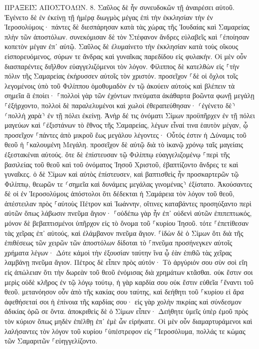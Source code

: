 \documentclass[twoside, 9pt]{extreport}
\begin{document}
ΠΡΑΞΕΙΣ ΑΠΟΣΤΟΛΩΝ.
8.
Σαῦλος δὲ ἦν συνευδοκῶν τῇ ἀναιρέσει αὐτοῦ. Ἐγένετο δὲ ἐν ἐκείνῃ τῇ ἡμέρᾳ διωγμὸς μέγας ἐπὶ τὴν ἐκκλησίαν τὴν ἐν Ἱεροσολύμοις· πάντες δὲ διεσπάρησαν κατὰ τὰς χώρας τῆς Ἰουδαίας καὶ Σαμαρείας πλὴν τῶν ἀποστόλων. 
συνεκόμισαν δὲ τὸν Στέφανον ἄνδρες εὐλαβεῖς καὶ ⸀ἐποίησαν κοπετὸν μέγαν ἐπ᾽ αὐτῷ. 
Σαῦλος δὲ ἐλυμαίνετο τὴν ἐκκλησίαν κατὰ τοὺς οἴκους εἰσπορευόμενος, σύρων τε ἄνδρας καὶ γυναῖκας παρεδίδου εἰς φυλακήν. 
Οἱ μὲν οὖν διασπαρέντες διῆλθον εὐαγγελιζόμενοι τὸν λόγον. 
Φίλιππος δὲ κατελθὼν εἰς ⸀τὴν πόλιν τῆς Σαμαρείας ἐκήρυσσεν αὐτοῖς τὸν χριστόν. 
προσεῖχον ⸀δὲ οἱ ὄχλοι τοῖς λεγομένοις ὑπὸ τοῦ Φιλίππου ὁμοθυμαδὸν ἐν τῷ ἀκούειν αὐτοὺς καὶ βλέπειν τὰ σημεῖα ἃ ἐποίει· 
⸀πολλοὶ γὰρ τῶν ἐχόντων πνεύματα ἀκάθαρτα βοῶντα φωνῇ μεγάλῃ ⸀ἐξήρχοντο, πολλοὶ δὲ παραλελυμένοι καὶ χωλοὶ ἐθεραπεύθησαν· 
⸂ἐγένετο δὲ⸃ ⸂πολλὴ χαρὰ⸃ ἐν τῇ πόλει ἐκείνῃ. 
Ἀνὴρ δέ τις ὀνόματι Σίμων προϋπῆρχεν ἐν τῇ πόλει μαγεύων καὶ ⸀ἐξιστάνων τὸ ἔθνος τῆς Σαμαρείας, λέγων εἶναί τινα ἑαυτὸν μέγαν, 
ᾧ προσεῖχον ⸀πάντες ἀπὸ μικροῦ ἕως μεγάλου λέγοντες· Οὗτός ἐστιν ἡ Δύναμις τοῦ θεοῦ ἡ ⸀καλουμένη Μεγάλη. 
προσεῖχον δὲ αὐτῷ διὰ τὸ ἱκανῷ χρόνῳ ταῖς μαγείαις ἐξεστακέναι αὐτούς. 
ὅτε δὲ ἐπίστευσαν τῷ Φιλίππῳ εὐαγγελιζομένῳ ⸀περὶ τῆς βασιλείας τοῦ θεοῦ καὶ τοῦ ὀνόματος Ἰησοῦ Χριστοῦ, ἐβαπτίζοντο ἄνδρες τε καὶ γυναῖκες. 
ὁ δὲ Σίμων καὶ αὐτὸς ἐπίστευσεν, καὶ βαπτισθεὶς ἦν προσκαρτερῶν τῷ Φιλίππῳ, θεωρῶν τε ⸂σημεῖα καὶ δυνάμεις μεγάλας γινομένας⸃ ἐξίστατο. 
Ἀκούσαντες δὲ οἱ ἐν Ἱεροσολύμοις ἀπόστολοι ὅτι δέδεκται ἡ Σαμάρεια τὸν λόγον τοῦ θεοῦ, ἀπέστειλαν πρὸς ⸀αὐτοὺς Πέτρον καὶ Ἰωάννην, 
οἵτινες καταβάντες προσηύξαντο περὶ αὐτῶν ὅπως λάβωσιν πνεῦμα ἅγιον· 
⸀οὐδέπω γὰρ ἦν ἐπ᾽ οὐδενὶ αὐτῶν ἐπιπεπτωκός, μόνον δὲ βεβαπτισμένοι ὑπῆρχον εἰς τὸ ὄνομα τοῦ ⸀κυρίου Ἰησοῦ. 
τότε ⸀ἐπετίθεσαν τὰς χεῖρας ἐπ᾽ αὐτούς, καὶ ἐλάμβανον πνεῦμα ἅγιον. 
⸀ἰδὼν δὲ ὁ Σίμων ὅτι διὰ τῆς ἐπιθέσεως τῶν χειρῶν τῶν ἀποστόλων δίδοται τὸ ⸀πνεῦμα προσήνεγκεν αὐτοῖς χρήματα 
λέγων· Δότε κἀμοὶ τὴν ἐξουσίαν ταύτην ἵνα ᾧ ἐὰν ἐπιθῶ τὰς χεῖρας λαμβάνῃ πνεῦμα ἅγιον. 
Πέτρος δὲ εἶπεν πρὸς αὐτόν· Τὸ ἀργύριόν σου σὺν σοὶ εἴη εἰς ἀπώλειαν ὅτι τὴν δωρεὰν τοῦ θεοῦ ἐνόμισας διὰ χρημάτων κτᾶσθαι. 
οὐκ ἔστιν σοι μερὶς οὐδὲ κλῆρος ἐν τῷ λόγῳ τούτῳ, ἡ γὰρ καρδία σου οὐκ ἔστιν εὐθεῖα ⸀ἔναντι τοῦ θεοῦ. 
μετανόησον οὖν ἀπὸ τῆς κακίας σου ταύτης, καὶ δεήθητι τοῦ ⸀κυρίου εἰ ἄρα ἀφεθήσεταί σοι ἡ ἐπίνοια τῆς καρδίας σου· 
εἰς γὰρ χολὴν πικρίας καὶ σύνδεσμον ἀδικίας ὁρῶ σε ὄντα. 
ἀποκριθεὶς δὲ ὁ Σίμων εἶπεν· Δεήθητε ὑμεῖς ὑπὲρ ἐμοῦ πρὸς τὸν κύριον ὅπως μηδὲν ἐπέλθῃ ἐπ᾽ ἐμὲ ὧν εἰρήκατε. 
Οἱ μὲν οὖν διαμαρτυράμενοι καὶ λαλήσαντες τὸν λόγον τοῦ κυρίου ⸀ὑπέστρεφον εἰς ⸀Ἱεροσόλυμα, πολλάς τε κώμας τῶν Σαμαριτῶν ⸀εὐηγγελίζοντο. 
\end{document}
